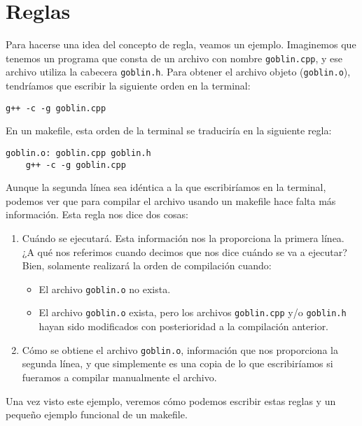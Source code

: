 \documentclass[11pt,twoside,titlepage,a4paper]{article}
\theoremstyle{definition}
\theoremstyle{plain_rojo}
\theoremstyle{remark}
\begin{document}

\section{Reglas}

Para hacerse una idea del concepto de regla, veamos un ejemplo. Imaginemos que
tenemos un programa que consta de un archivo con nombre \texttt{goblin.cpp}, y
ese archivo utiliza la cabecera \texttt{goblin.h}. Para obtener el archivo 
objeto (\texttt{goblin.o}), tendríamos que escribir la siguiente orden en la terminal:
\bigskip
\begin{lstlisting}
g++ -c -g goblin.cpp
\end{lstlisting}
\bigskip
En un makefile, esta orden de la terminal se traduciría en la siguiente regla:
\bigskip
\begin{lstlisting}
goblin.o: goblin.cpp goblin.h
	g++ -c -g goblin.cpp
\end{lstlisting}
\bigskip
Aunque la segunda línea sea idéntica a la que escribiríamos en la terminal,
podemos ver que para compilar el archivo usando un makefile hace falta más
información. Esta regla nos dice dos cosas:

\begin{enumerate}[font={\color{rojooscuro}\bfseries}]
	\item Cuándo se ejecutará. Esta información nos la proporciona la primera
	línea. ¿A qué nos referimos cuando decimos que nos dice cuándo se va a 
	ejecutar? Bien, solamente realizará la orden de compilación cuando:
	\begin{itemize}[font={\color{rojooscuro}\bfseries}]
		\item El archivo \texttt{goblin.o} no exista.
		\item El archivo \texttt{goblin.o} exista, pero los archivos
		\texttt{goblin.cpp} y/o \texttt{goblin.h} hayan sido modificados con
		posterioridad a la compilación anterior.
	\end{itemize}
	\item Cómo se obtiene el archivo \texttt{goblin.o}, información que nos
	proporciona la segunda línea, y que simplemente es una copia de lo que
	escribiríamos si fueramos a compilar manualmente el archivo.
\end{enumerate}

Una vez visto este ejemplo, veremos cómo podemos escribir estas reglas y un
pequeño ejemplo funcional de un makefile.
\end{document}
